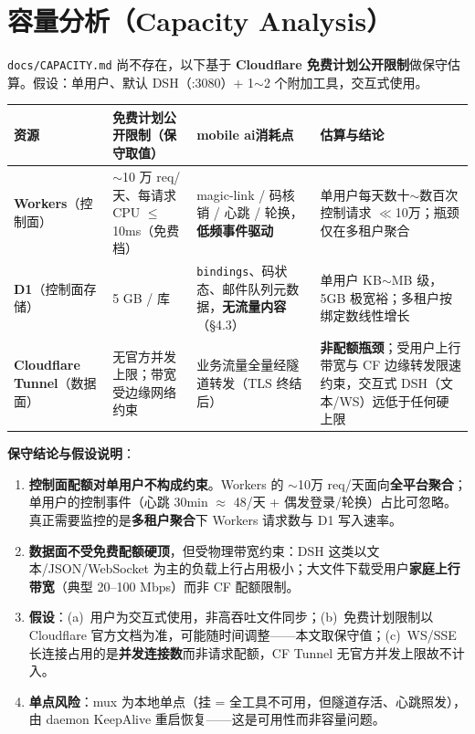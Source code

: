 \documentclass[10pt,a4paper]{article}
\newcommand{\sys}{mobile ai}
\begin{document}
\section{容量分析（Capacity Analysis）}

\noindent \texttt{docs/CAPACITY.md} 尚不存在，以下基于 \textbf{Cloudflare 免费计划公开限制}做保守估算。假设：单用户、默认 DSH（:3080）+ 1$\sim$2 个附加工具，交互式使用。

\begin{longtable}{@{}p{2.5cm}p{3.7cm}p{4.0cm}p{4.6cm}@{}}
\toprule
资源 & 免费计划公开限制（保守取值） & \sys 消耗点 & 估算与结论\\
\midrule
\textbf{Workers}（控制面） & $\sim$10 万 req/天、每请求 CPU $\leq$10ms（免费档） & magic-link / 码核销 / 心跳 / 轮换，\textbf{低频事件驱动} & 单用户每天数十$\sim$数百次控制请求 $\ll$10万；瓶颈仅在多租户聚合\\
\addlinespace[2pt]
\textbf{D1}（控制面存储） & 5 GB / 库 & \texttt{bindings}、码状态、邮件队列元数据，\textbf{无流量内容}（§4.3） & 单用户 KB$\sim$MB 级，5GB 极宽裕；多租户按绑定数线性增长\\
\addlinespace[2pt]
\textbf{Cloudflare Tunnel}（数据面） & 无官方并发上限；带宽受边缘网络约束 & 业务流量全量经隧道转发（TLS 终结后） & \textbf{非配额瓶颈}；受用户上行带宽与 CF 边缘转发限速约束，交互式 DSH（文本/WS）远低于任何硬上限\\
\bottomrule
\end{longtable}

\noindent\textbf{保守结论与假设说明}：
\begin{enumerate}[leftmargin=1.6em,itemsep=0.25em,topsep=0.3em]
  \item \textbf{控制面配额对单用户不构成约束}。Workers 的 $\sim$10万 req/天面向\textbf{全平台聚合}；单用户的控制事件（心跳 30min $\approx$ 48/天 + 偶发登录/轮换）占比可忽略。真正需要监控的是\textbf{多租户聚合}下 Workers 请求数与 D1 写入速率。
  \item \textbf{数据面不受免费配额硬顶}，但受物理带宽约束：DSH 这类以文本/JSON/WebSocket 为主的负载上行占用极小；大文件下载受用户\textbf{家庭上行带宽}（典型 20--100 Mbps）而非 CF 配额限制。
  \item \textbf{假设}：(a)~用户为交互式使用，非高吞吐文件同步；(b)~免费计划限制以 Cloudflare 官方文档为准，可能随时间调整——本文取保守值；(c)~WS/SSE 长连接占用的是\textbf{并发连接数}而非请求配额，CF Tunnel 无官方并发上限故不计入。
  \item \textbf{单点风险}：mux 为本地单点（挂 = 全工具不可用，但隧道存活、心跳照发），由 daemon KeepAlive 重启恢复——这是可用性而非容量问题。
\end{enumerate}
\end{document}
